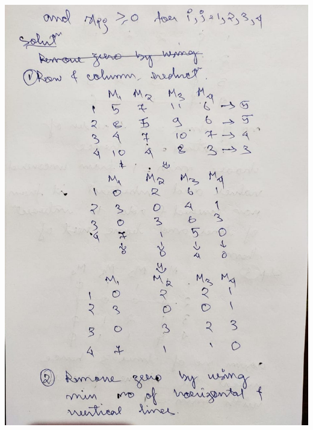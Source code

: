 \documentclass[12pt, letterpaper, twoside]{book}
\begin{document}
\includegraphics[width=\paperwidth, height=\paperheight]{Page9}
\end{document}
